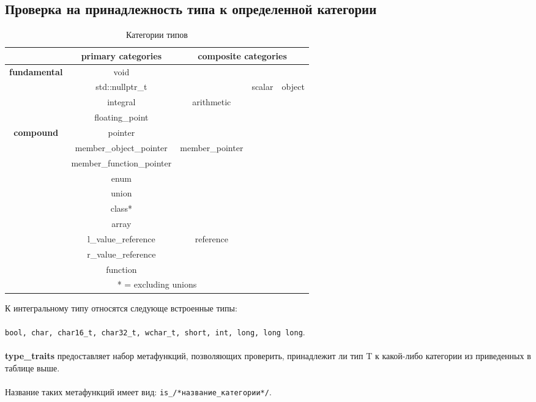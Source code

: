 \subsection{Проверка на принадлежность типа к определенной категории}
\begin{table}[H]
	\caption{\label{tab:types} Категории типов}
	\begin{center}
\begin{tabular}{|c|c|c|c|c|}
	\hline 
	& \textbf{primary categories} & \multicolumn{3}{|c|}{\textbf{composite categories}} \\ 
	\hline 
	\multirow{4}{*}{\textbf{fundamental}} & void &  &  &  \\ 
	\cline{2-5}
	& std::nullptr\_t &  & \multirow{7}{*}{scalar} & \multirow{10}{*}{object} \\ 
	\cline{2-3} 
	& integral & \multirow{2}{*}{arithmetic} &  & \\ 
	\cline{2-2} 
	& floating\_point  &  &  &  \\ 
	\cline{1-3} 
	\multirow{10}{*}{\textbf{compound}}& pointer &  &  &  \\ 
	\cline{2-3} 
	& member\_object\_pointer  & \multirow{2}{*}{member\_pointer}  &  &  \\ 
	\cline{2-2} 
	& member\_function\_pointer  &  &  &  \\ 
	\cline{2-3} 
	& enum &  &  &  \\ 
	\cline{2-4} 
	& union &  &  &  \\ 
	\cline{2-4} 
	& class* &  &  &  \\ 
	\cline{2-4} 
	& array &  &  &  \\ 
	\cline{2-5} 
	& l\_value\_reference  & \multirow{2}{*}{reference} &  &  \\ 
	\cline{2-2} \cline{4-5} 
	& r\_value\_reference &  &  &  \\ 
	\cline{2-5} 
	& function  &  &  &  \\ 
	\cline{1-5} 
	\multicolumn{5}{|c|}{* = excluding unions} \\ 
	\hline 
\end{tabular}
\end{center}
\end{table}
К интегральному типу относятся следующе встроенные типы:\\\\
\texttt{bool, char, char16\_t, char32\_t, wchar\_t, short, int, long, long long}. \\\\
\textbf{type\_traits} предоставляет набор метафункций, позволяющих проверить, принадлежит ли тип T к какой-либо категории из приведенных в таблице выше. \\\\
Название таких метафункций имеет вид: \texttt{is\_/*название\_категории*/}.
